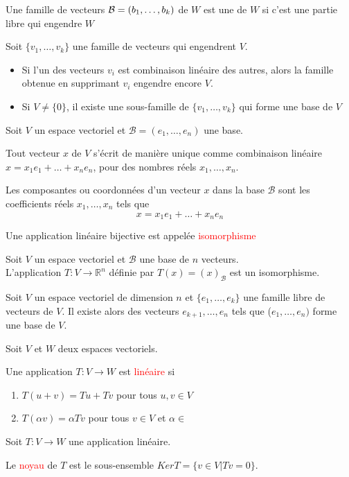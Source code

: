 \begin{definition}
    Une famille  de vecteurs $\mathcal{B} = (b_1, \dots, b_k)$ de $W$ est une  de $W$ si c'est une partie libre qui engendre $W$ 
\end{definition}
Soit $\{v_1, \dots, v_k\}$ une famille de vecteurs qui engendrent $V$.
\begin{theoreme}
    \begin{itemize}
        \item Si l'un des vecteurs $v_i$ est combinaison linéaire des autres, alors la famille obtenue en supprimant $v_i$ engendre encore $V$.
        \item Si $V \neq \{0\}$, il existe une sous-famille de $\{v_1, \dots, v_k\}$ qui forme une base de $V$
    \end{itemize}
\end{theoreme}
Soit $V$ un espace vectoriel et $\mathcal{B} = (e_1, \dots, e_n)$ une base.
\begin{theoreme}
    Tout vecteur $x$ de $V$ s'écrit de manière unique comme combinaison linéaire $x = x_1e_1 + \dots + x_ne_n$, pour des nombres réels $x_1, \dots, x_n$.
\end{theoreme}
\begin{definition}
    Les composantes ou coordonnées d'un vecteur $x$ dans la base $\mathcal{B}$ sont les coefficients réels $x_1, \dots, x_n$ tels que
    \[x = x_1e_1 + \dots + x_ne_n\]
\end{definition}
\begin{definition}
    Une application linéaire bijective est appelée \textcolor{red}{isomorphisme}
\end{definition}
\begin{theoreme}
    Soit $V$ un espace vectoriel et $\mathcal{B}$ une base de $n$ vecteurs. \\
    L'application $T : V \to \mathbb{R}^n$ définie par $T(x) = (x)_{\mathcal{B}}$ est un isomorphisme.
\end{theoreme}
\begin{theoreme}
    Soit $V$ un espace vectoriel de dimension $n$ et $\{e_1, \dots, e_k\}$ une famille libre de vecteurs de $V$. Il existe alors des vecteurs $e_{k+1}, \dots, e_n$ tels que ($e_1, \dots, e_n)$ forme une base de $V$.
\end{theoreme}
Soit $V$ et $W$ deux espaces vectoriels.
\begin{definition}
    Une application $T : V \to W$ est \textcolor{red}{linéaire} si
    \begin{enumerate}
        \item $T(u + v) = Tu + Tv$ pour tous $u, v \in V$
        \item $T(\alpha v) = \alpha Tv$ pour tous $v \in V$ et $\alpha \in $\R
    \end{enumerate}
\end{definition}
Soit $T: V \to W$ une application linéaire.
\begin{definition}
    Le \textcolor{red}{noyau} de $T$ est le sous-ensemble $Ker T = \{v \in V | Tv = 0\}$.
\end{definition}

